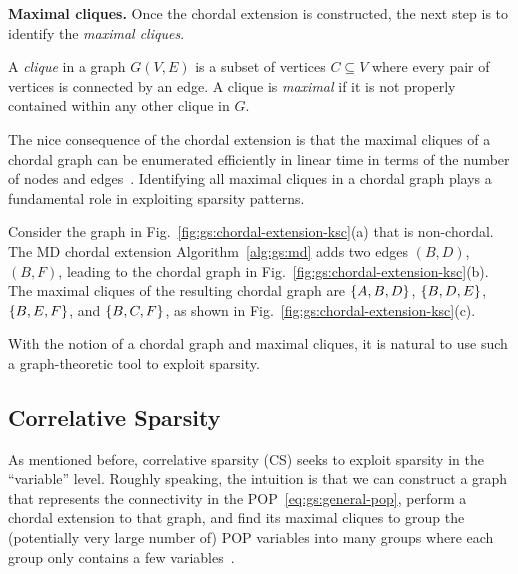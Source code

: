\textbf{Maximal cliques.} Once the chordal extension is constructed, the next step is to identify the \emph{maximal cliques}. 

\begin{definition}[Clique]
    A \emph{clique} in a graph $G(V, E)$ is a subset of vertices $C \subseteq V$ where every pair of vertices is connected by an edge. 
    A clique is \emph{maximal} if it is not properly contained within any other clique in $G$.
\end{definition}

The nice consequence of the chordal extension is that the maximal cliques of a chordal graph can be enumerated efficiently in linear time in terms of the number of nodes and edges~\cite{Delbert1965pjm-matrix-and-graph, Hans2010iac-treewidth-computations, golumbic2004algorithmic}. 
Identifying all maximal cliques in a chordal graph plays a fundamental role in exploiting sparsity patterns.



\begin{example}
    Consider the graph in Fig.~\ref{fig:gs:chordal-extension-ksc}(a) that is non-chordal. The MD chordal extension Algorithm~\ref{alg:gs:md} adds two edges $(B,D)$, $(B,F)$, leading to the chordal graph in Fig.~\ref{fig:gs:chordal-extension-ksc}(b). 
    The maximal cliques of the resulting chordal graph are $\left\{A,B,D\right\}$, $\left\{B,D,E\right\}$, $\left\{B,E,F\right\}$, and $\left\{B,C,F\right\}$, as shown in Fig.~\ref{fig:gs:chordal-extension-ksc}(c).
\end{example}

With the notion of a chordal graph and maximal cliques, it is natural to use such a graph-theoretic tool to exploit sparsity.


\subsection{Correlative Sparsity}
\label{sec:gs:cs}

As mentioned before, correlative sparsity (CS) seeks to exploit sparsity in the ``variable'' level. Roughly speaking, the intuition is that we can construct a graph that represents the connectivity in the POP~\eqref{eq:gs:general-pop}, perform a chordal extension to that graph, and find its maximal cliques to group the (potentially very large number of) POP variables into many groups where each group only contains a few variables~\cite{Waki2006siam-sos-semidefinite-relaxation}.

